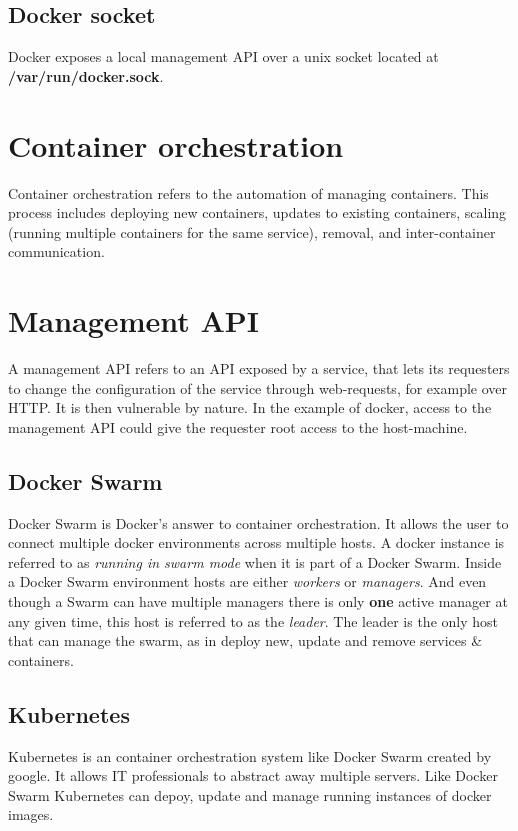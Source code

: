 \subsection{Docker socket}
Docker exposes a local management API over a unix socket located at \textbf{/var/run/docker.sock}.

\section{Container orchestration}
Container orchestration refers to the automation of managing containers. This process includes deploying new containers, updates to existing containers, scaling (running multiple containers for the same service), removal, and inter-container communication.

\section{Management API}
A management API refers to an API exposed by a service, that lets its requesters to change the configuration of the service through web-requests, for example over HTTP. It is then vulnerable by nature. In the example of docker, access to the management API could give the requester root access to the host-machine.

\subsection{Docker Swarm}
Docker Swarm is Docker's answer to container orchestration. It allows the user to connect multiple docker environments across multiple hosts. A docker instance is referred to as \textit{running in swarm mode} when it is part of a Docker Swarm. Inside a Docker Swarm environment hosts are either \textit{workers} or \textit{managers}. And even though a Swarm can have multiple managers there is only \textbf{one} active manager at any given time, this host is referred to as the \textit{leader}. The leader is the only host that can manage the swarm, as in deploy new, update and remove services \& containers. 

\subsection{Kubernetes}
Kubernetes is an container orchestration system like Docker Swarm created by google. It allows IT professionals to abstract away multiple servers. Like Docker Swarm Kubernetes can depoy, update and manage running instances of docker images.

